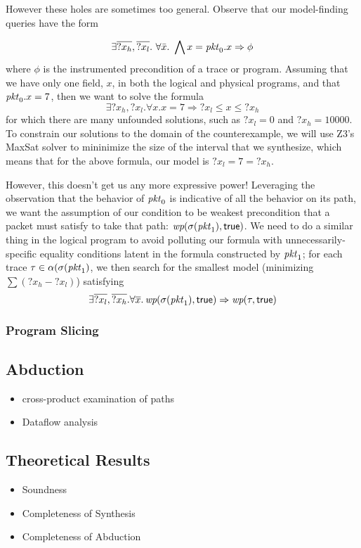 However these holes are sometimes too general. Observe that our
model-finding queries have the form

\[\exists \overline{?x_h},\overline{?x_l}.~\forall \bar x.~\bigwedge x = \mathit{pkt}_0.x \Rightarrow \phi\]
where $\phi$ is the instrumented precondition of a trace or
program. Assuming that we have only one field, $x$, in both the
logical and physical programs, and that $\mathit{pkt}_0.x = 7$, then
we want to solve the formula
\[\exists ?x_h,?x_l. \forall x. x = 7 \Rightarrow ?x_l \leq x \leq ?x_h\]
for which there are many unfounded solutions, such as $?x_l = 0$ and
$?x_h = 10000$. To constrain our solutions to the domain of the
counterexample, we will use Z3's MaxSat solver to mininimize the size
of the interval that we synthesize, which means that for the above
formula, our model is $?x_l = 7 = ?x_h$.

However, this doesn't get us any more expressive power! Leveraging the
observation that the behavior of $\mathit{pkt}_0$ is indicative of all the
behavior on its path, we want the assumption of our condition to be
weakest precondition that a packet must satisfy to take that path:
$\mathop{\textit{wp}}(\sigma(\mathit{pkt}_1), \mathsf{true})$. We need to do a similar thing in the
logical program to avoid polluting our formula with
unnecessarily-specific equality conditions latent in the formula
constructed by $\mathit{pkt}_1$; for each trace
$\tau \in \alpha(\sigma(\mathit{pkt}_1)$, we then search for the smallest
model (minimizing $\sum (?x_h - ?x_l)$) satisfying
\[\exists \overline{?x_l},\overline{?x_h}. \forall \overline
  x. \mathop{\textit{wp}}(\sigma(\mathit{pkt}_1),\mathsf{true}) \Rightarrow \mathop{\textit{wp}}(\tau, \mathsf{true})\]

\subsubsection{Program Slicing}


\subsection{Abduction}
\begin{itemize}
\item cross-product examination of paths
\item Dataflow analysis
\end{itemize}

\subsection{Theoretical Results}
\begin{itemize}
\item Soundness
\item Completeness of Synthesis
\item Completeness of Abduction
\end{itemize}

